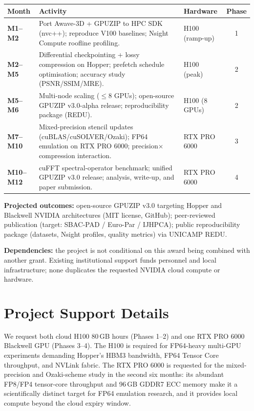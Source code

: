 \documentclass[11pt,a4paper]{article}
\newcommand{\gpuzip}{GPUZIP}
\begin{document}
\begin{center}
\small
\begin{tabularx}{\textwidth}{@{}l X l c@{}}
\toprule
\textbf{Month} & \textbf{Activity} & \textbf{Hardware} & \textbf{Phase} \\
\midrule
\textbf{M1--M2} & Port Awave-3D + \gpuzip{} to HPC SDK (nvc++); reproduce
  V100 baselines; Nsight Compute roofline profiling. & H100 (ramp-up) & 1 \\
\addlinespace
\textbf{M2--M5} & Differential checkpointing + lossy compression on Hopper;
  prefetch schedule optimisation; accuracy study (PSNR/SSIM/MRE). & H100
  (peak) & 2 \\
\addlinespace
\textbf{M5--M6} & Multi-node scaling ($\leq$8 GPUs); open-source \gpuzip{}
  v3.0-alpha release; reproducibility package (REDU). & H100 (8 GPUs) & 2 \\
\addlinespace
\textbf{M7--M10} & Mixed-precision stencil updates (cuBLAS/cuSOLVER/Ozaki);
  FP64 emulation on RTX PRO 6000; precision$\times$compression interaction. &
  RTX PRO 6000 & 3 \\
\addlinespace
\textbf{M10--M12} & cuFFT spectral-operator benchmark; unified \gpuzip{}
  v3.0 release; analysis, write-up, and paper submission. & RTX PRO 6000 &
  4 \\
\bottomrule
\end{tabularx}
\end{center}

\textbf{Projected outcomes:} open-source \gpuzip{} v3.0 targeting Hopper and
Blackwell NVIDIA architectures (MIT license, GitHub); peer-reviewed publication
(target: SBAC-PAD / Euro-Par / IJHPCA); public reproducibility package
(datasets, Nsight profiles, quality metrics) via UNICAMP REDU.

\textbf{Dependencies:} the project is not conditional on this award being
combined with another grant. Existing institutional support funds personnel and
local infrastructure; none duplicates the requested NVIDIA cloud compute or
hardware.

\section*{Project Support Details}

We request both cloud H100 80\,GB hours (Phases 1--2) and one RTX PRO 6000
Blackwell GPU (Phases 3--4). The H100 is required for FP64-heavy multi-GPU
experiments demanding Hopper's HBM3 bandwidth, FP64 Tensor Core throughput, and
NVLink fabric. The RTX PRO 6000 is requested for the mixed-precision and
Ozaki-scheme study in the second six months: its abundant FP8/FP4 tensor-core
throughput and 96\,GB GDDR7 ECC memory make it a scientifically distinct target
for FP64 emulation research, and it provides local compute beyond the cloud
expiry window.
\end{document}

